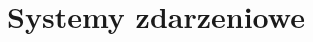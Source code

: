 \documentclass[12pt, a4paper]{article}
\title{Systemy zdarzeniowe}
\begin{document}
\def\tablename{Tabela}
\begin{titlingpage}
\maketitle
\end{titlingpage}
\newpage
\tableofcontents %
\newpage
\newpage
\newpage
 \newpage
 \newpage
 


\newpage

\end{document}
